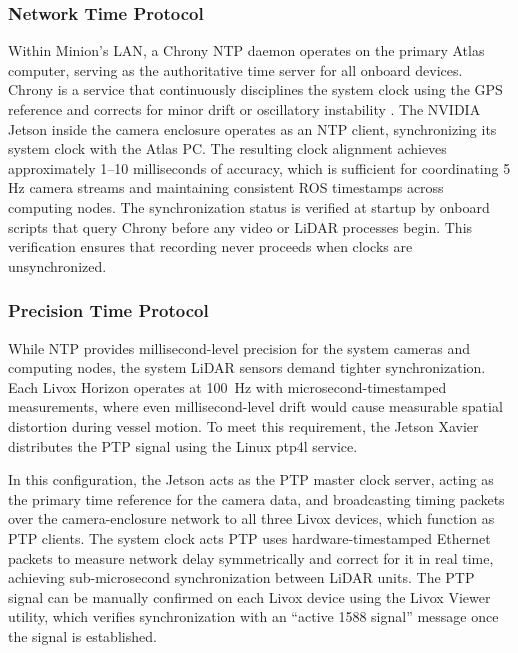 \documentclass{erauthesis}
\begin{document}
\subsubsection{Network Time Protocol}
Within Minion's \ac{LAN}, a Chrony \ac{NTP} daemon operates on the primary Atlas computer, serving as the authoritative time server for all onboard devices.
Chrony is a service that continuously disciplines the system clock using the GPS reference and corrects for minor drift or oscillatory instability \cite{chrony}.
The NVIDIA Jetson inside the camera enclosure operates as an \ac{NTP} client, synchronizing its system clock with the Atlas PC.
The resulting clock alignment achieves approximately 1–10 milliseconds of accuracy, which is sufficient for coordinating 5 Hz camera streams and maintaining consistent ROS timestamps across computing nodes.
The synchronization status is verified at startup by onboard scripts that query Chrony before any video or LiDAR processes begin. 
This verification ensures that recording never proceeds when clocks are unsynchronized.

\subsubsection{Precision Time Protocol}
While \ac{NTP} provides millisecond-level precision for the system cameras and computing nodes, the system LiDAR sensors demand tighter synchronization. Each Livox Horizon operates at 100~Hz with microsecond-timestamped measurements, where even millisecond-level drift would cause measurable spatial distortion during vessel motion. To meet this requirement, the Jetson Xavier distributes the \ac{PTP} signal using the Linux ptp4l service.

In this configuration, the Jetson acts as the \ac{PTP} master clock server, acting as the primary time reference for the camera data, and broadcasting timing packets over the camera-enclosure network to all three Livox devices, which function as \ac{PTP} clients. The system clock acts \ac{PTP} uses hardware-timestamped Ethernet packets to measure network delay symmetrically and correct for it in real time, achieving sub-microsecond synchronization between LiDAR units.
The PTP signal can be manually confirmed on each Livox device using the Livox Viewer utility, which verifies synchronization with an “active 1588 signal” message once the signal is established.
\end{document}
